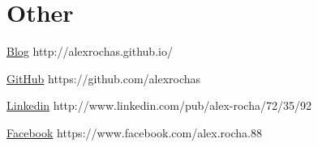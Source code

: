 \documentclass{tccv}
\begin{document}
\section{Other}

\begin{factlist}

\item{\href{http://alexrochas.github.io/}{Blog}}
    {http://alexrochas.github.io/}

\item{\href{https://github.com/alexrochas}{GitHub}}
    {https://github.com/alexrochas}

\item{\href{http://www.linkedin.com/pub/alex-rocha/72/35/92}{Linkedin}}
    {http://www.linkedin.com/pub/\linebreak[1]alex-rocha/72/35/92}

\item{\href{https://www.facebook.com/alex.rocha.88}{Facebook}}
{https://www.facebook.com/\linebreak[1]alex.rocha.88}

\end{factlist}
\end{document}
